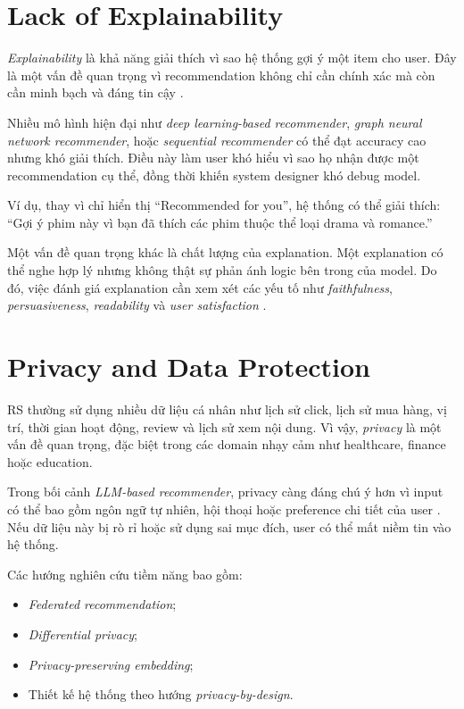 \documentclass[12pt,a4paper]{article}
\begin{document}
\section{Lack of Explainability}

\textit{Explainability} là khả năng giải thích vì sao hệ thống gợi ý một item cho user. 
Đây là một vấn đề quan trọng vì recommendation không chỉ cần chính xác mà còn cần minh bạch và đáng tin cậy \cite{zhang2020explainable}. 

Nhiều mô hình hiện đại như \textit{deep learning-based recommender}, \textit{graph neural network recommender}, hoặc \textit{sequential recommender} có thể đạt accuracy cao nhưng khó giải thích. 
Điều này làm user khó hiểu vì sao họ nhận được một recommendation cụ thể, đồng thời khiến system designer khó debug model.

Ví dụ, thay vì chỉ hiển thị ``Recommended for you'', hệ thống có thể giải thích: 
``Gợi ý phim này vì bạn đã thích các phim thuộc thể loại drama và romance.''

Một vấn đề quan trọng khác là chất lượng của explanation. 
Một explanation có thể nghe hợp lý nhưng không thật sự phản ánh logic bên trong của model. 
Do đó, việc đánh giá explanation cần xem xét các yếu tố như \textit{faithfulness}, \textit{persuasiveness}, \textit{readability} và \textit{user satisfaction} \cite{chen2022why}.

\section{Privacy and Data Protection}

RS thường sử dụng nhiều dữ liệu cá nhân như lịch sử click, lịch sử mua hàng, vị trí, thời gian hoạt động, review và lịch sử xem nội dung. 
Vì vậy, \textit{privacy} là một vấn đề quan trọng, đặc biệt trong các domain nhạy cảm như healthcare, finance hoặc education.

Trong bối cảnh \textit{LLM-based recommender}, privacy càng đáng chú ý hơn vì input có thể bao gồm ngôn ngữ tự nhiên, hội thoại hoặc preference chi tiết của user \cite{wu2024llmrec,fan2024llmrec}. 
Nếu dữ liệu này bị rò rỉ hoặc sử dụng sai mục đích, user có thể mất niềm tin vào hệ thống.

Các hướng nghiên cứu tiềm năng bao gồm:

\begin{itemize}[leftmargin=*]
    \item \textit{Federated recommendation};
    \item \textit{Differential privacy};
    \item \textit{Privacy-preserving embedding};
    \item Thiết kế hệ thống theo hướng \textit{privacy-by-design}.
\end{itemize}
\end{document}

